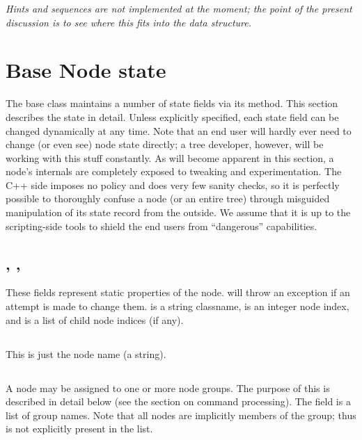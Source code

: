 \documentclass[10pt,twoside]{book}
\begin{document}
  {\em Hints and sequences are not implemented at the moment; the point of
  the present discussion is to see where this fits into the data structure.}

\chapter{Base Node state}

  The base  class maintains a number of state fields via its
   method. This section describes the state in detail.
  Unless explicitly specified, each state field can be changed dynamically at
  any time. Note that an end user will hardly ever need to change (or even see)
  node state directly; a tree developer, however, will be working with this
  stuff constantly. As will become apparent in this section, a node's internals
  are completely exposed to tweaking and experimentation. The C++ side imposes
  no policy and does very few sanity checks, so it is perfectly possible  to
  thoroughly confuse a node (or an entire tree) through misguided  manipulation
  of its state record from the outside. We assume that it is up to the
  scripting-side tools to shield the end users from ``dangerous'' capabilities.

\section{, , } 
  
  These fields represent static properties of the node. 
  will throw an exception if an attempt is made to change them.  is a
  string classname,  is an integer node index, and 
  is a list of child node indices (if any).

\section{}
  
  This is just the node name (a string). 
 
\section{}
  
  A node may be assigned to one or more node groups. The purpose of this is
  described in detail below (see the section on command processing). The
   field is a list of  group names. Note that all
  nodes are implicitly members of the  group; thus  is not
  explicitly present in the list.
\end{document}
